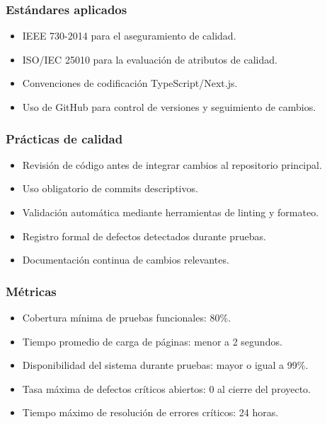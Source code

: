 \documentclass[12pt,a4paper]{article}
\begin{document}
\subsubsection*{Estándares aplicados}

\begin{itemize}
    \item IEEE 730-2014 para el aseguramiento de calidad.
    \item ISO/IEC 25010 para la evaluación de atributos de calidad.
    \item Convenciones de codificación TypeScript/Next.js.
    \item Uso de GitHub para control de versiones y seguimiento de cambios.
\end{itemize}

\subsubsection*{Prácticas de calidad}

\begin{itemize}
    \item Revisión de código antes de integrar cambios al repositorio principal.
    \item Uso obligatorio de commits descriptivos.
    \item Validación automática mediante herramientas de linting y formateo.
    \item Registro formal de defectos detectados durante pruebas.
    \item Documentación continua de cambios relevantes.
\end{itemize}

\subsubsection*{Métricas}

\begin{itemize}
    \item Cobertura mínima de pruebas funcionales: 80\%.
    \item Tiempo promedio de carga de páginas: menor a 2 segundos.
    \item Disponibilidad del sistema durante pruebas: mayor o igual a 99\%.
    \item Tasa máxima de defectos críticos abiertos: 0 al cierre del proyecto.
    \item Tiempo máximo de resolución de errores críticos: 24 horas.
\end{itemize}
\end{document}

